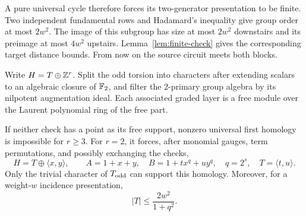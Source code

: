 A pure universal cycle therefore forces its two-generator presentation to be finite. Two independent fundamental rows and Hadamard's inequality give group order at most $2w^2$. The image of this subgroup has size at most $2w^2$ downstairs and its preimage at most $4w^2$ upstairs. Lemma~\ref{lem:finite-check} gives the corresponding target distance bounds. From now on the source circuit meets both blocks.

Write $H=T\oplus\mathbb Z^r$. Split the odd torsion into characters after extending scalars to an algebraic closure of $\mathbb F_2$, and filter the $2$-primary group algebra by its nilpotent augmentation ideal. Each associated graded layer is a free module over the Laurent polynomial ring of the free part.

\begin{lemma}\label{lem:structure}
If neither check has a point as its free support, nonzero universal first homology is impossible for $r\ge3$. For $r=2$, it forces, after monomial gauges, term permutations, and possibly exchanging the checks,
\begin{equation}\label{eq:frobenius}
 H=T\oplus\langle x,y\rangle,\qquad
 A=1+x+y,\quad B=1+t x^q+u y^q,
 \quad q=2^s,
 \quad T=\langle t,u\rangle.
\end{equation}
Only the trivial character of $T_{\rm odd}$ can support this homology. Moreover, for a weight-$w$ incidence presentation,
\begin{equation}\label{eq:torsion-bound}
 |T|\le\frac{2w^2}{1+q^2}.
\end{equation}
\end{lemma}
